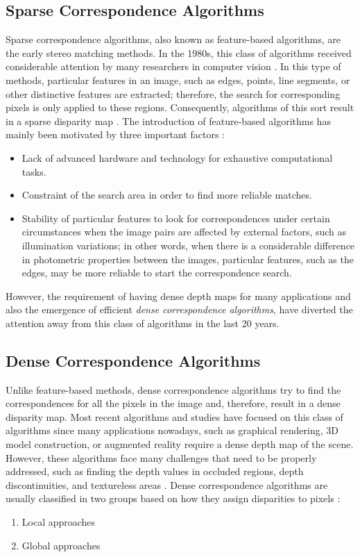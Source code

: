 \subsection{Sparse Correspondence Algorithms}
Sparse correspondence algorithms, also known as feature-based algorithms, are the early stereo matching methods. In the 1980s, this class of algorithms received considerable attention by
many researchers in computer vision \cite{dhon89}.
In this type of methods, particular features in an image, such as edges, 
points, line segments, or other distinctive features are extracted; therefore, the search for corresponding pixels is only applied to these regions. 
Consequently, algorithms of this
sort result in a sparse disparity map \cite{matt89,hsie92, sze11}. The introduction of feature-based algorithms has mainly been motivated by three important factors \cite{bro03,sze11}:
\begin{itemize}
\item Lack of advanced hardware and technology for exhaustive computational tasks.
\item Constraint of the search area in order to find more reliable matches.
\item Stability of particular features to look for correspondences under certain circumstances when the image pairs are affected by external factors, 
such as illumination variations; in other words, when there is a considerable difference in photometric properties between the images, 
particular features, such as the edges, may be more reliable to start the correspondence search.
\end{itemize}
\noindent
However, the requirement of having dense depth maps for many applications and also the emergence of efficient {\it dense correspondence algorithms}, have diverted the attention away
from this class of algorithms in the last 20 years.

\subsection{Dense Correspondence Algorithms}
Unlike feature-based methods, dense correspondence algorithms try to find the
correspondences for all the pixels in the image and, therefore, result in a dense disparity map. Most recent algorithms and studies have focused on this class of algorithms since many applications 
nowadays, such as graphical rendering, 3D model construction, or augmented reality require a dense depth map of the scene. 
However, these algorithms face many challenges that need to be properly
addressed, such as finding the depth values in occluded regions, depth discontinuities, and textureless areas \cite{sch02,bro03}. \newline
Dense correspondence algorithms are usually classified in two groups based on how they assign
disparities to pixels \cite{sze11}:
\begin{enumerate}
\item Local approaches
\item Global approaches
\end{enumerate}

